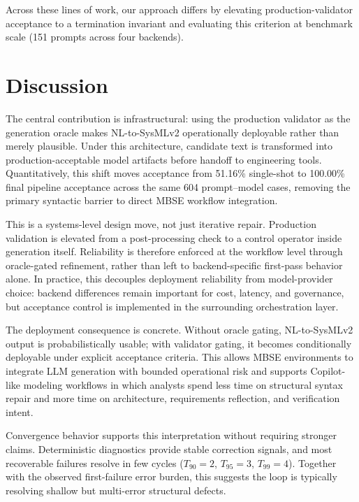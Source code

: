 \documentclass[colorlinks,upint,subscriptcorrection,varvw,hyphenate,balance]{asmeconf} %
\begin{document}
Across these lines of work, our approach differs by elevating production-validator acceptance to a termination invariant and evaluating this criterion at benchmark scale (151 prompts across four backends).






\section{Discussion}
The central contribution is infrastructural: using the production validator as the generation oracle makes NL-to-SysMLv2 operationally deployable rather than merely plausible. Under this architecture, candidate text is transformed into production-acceptable model artifacts before handoff to engineering tools. Quantitatively, this shift moves acceptance from 51.16\% single-shot to 100.00\% final pipeline acceptance across the same 604 prompt--model cases, removing the primary syntactic barrier to direct MBSE workflow integration.

This is a systems-level design move, not just iterative repair. Production validation is elevated from a post-processing check to a control operator inside generation itself. Reliability is therefore enforced at the workflow level through oracle-gated refinement, rather than left to backend-specific first-pass behavior alone. In practice, this decouples deployment reliability from model-provider choice: backend differences remain important for cost, latency, and governance, but acceptance control is implemented in the surrounding orchestration layer.

The deployment consequence is concrete. Without oracle gating, NL-to-SysMLv2 output is probabilistically usable; with validator gating, it becomes conditionally deployable under explicit acceptance criteria. This allows MBSE environments to integrate LLM generation with bounded operational risk and supports Copilot-like modeling workflows in which analysts spend less time on structural syntax repair and more time on architecture, requirements reflection, and verification intent.

Convergence behavior supports this interpretation without requiring stronger claims. Deterministic diagnostics provide stable correction signals, and most recoverable failures resolve in few cycles ($T_{90}=2$, $T_{95}=3$, $T_{99}=4$). Together with the observed first-failure error burden, this suggests the loop is typically resolving shallow but multi-error structural defects.
\end{document}
